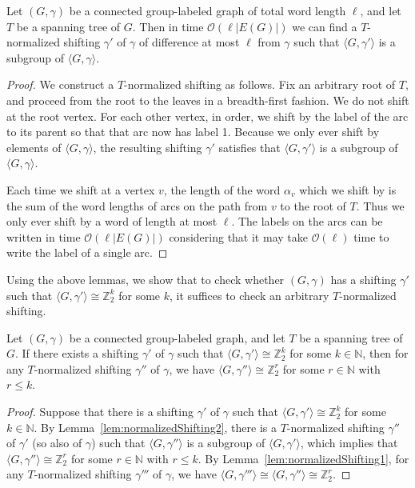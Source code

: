 \documentclass[a4paper, 12pt]{article}
\let\le\leqslant
\let\leq\leqslant
\begin{document}
\begin{lemma}
\label{lem:normalizedShifting2}
    Let $(G,\gamma)$ be a connected group-labeled graph of total word length $\ell$, and let $T$ be a spanning tree of $G$. Then in time $\mathcal{O}(\ell|E(G)|)$ we can find a $T$-normalized shifting $\gamma'$ of $\gamma$ of difference at most $\ell$ from $\gamma$ such that $\langle G, \gamma' \rangle$ is a subgroup of $\langle G, \gamma \rangle$.
\end{lemma}
\begin{proof}
    We construct a $T$-normalized shifting as follows. Fix an arbitrary root of $T$, and proceed from the root to the leaves in a breadth-first fashion. We do not shift at the root vertex. For each other vertex, in order, we shift by the label of the arc to its parent so that that arc now has label 1. Because we only ever shift by elements of $\langle G, \gamma\rangle$, the resulting shifting $\gamma'$ satisfies that $\langle G, \gamma'\rangle$ is a subgroup of $\langle G, \gamma \rangle$.
    
    Each time we shift at a vertex $v$, the length of the word $\alpha_v$ which we shift by is the sum of the word lengths of arcs on the path from $v$ to the root of $T$. Thus we only ever shift by a word of length at most $\ell$. The labels on the arcs can be written in time $\mathcal{O}(\ell|E(G)|)$ considering that it may take $\mathcal{O}(\ell)$ time to write the label of a single arc.
\end{proof}

Using the above lemmas, we show that to check whether $(G,\gamma)$ has a shifting $\gamma'$ such that $\langle G, \gamma'\rangle \cong \mathbb{Z}_2^k$ for some $k$, it suffices to check an arbitrary $T$-normalized shifting.

\begin{lemma}
\label{lem:normalizedShifting3}
    Let $(G, \gamma)$ be a connected group-labeled graph, and let $T$ be a spanning tree of $G$.
    If there exists a shifting $\gamma'$ of $\gamma$ such that $\langle G, \gamma' \rangle \cong \mathbb{Z}_2^k$ for some $k\in \mathbb{N}$, then for any $T$-normalized shifting $\gamma''$ of $\gamma$, we have $\langle G, \gamma'' \rangle \cong \mathbb{Z}_2^{r}$ for some $r \in \mathbb{N}$ with $r \leq k$.
\end{lemma}
\begin{proof}
    Suppose that there is a shifting $\gamma'$ of $\gamma$ such that $\langle G, \gamma' \rangle \cong \mathbb{Z}_2^k$ for some $k\in \mathbb{N}$. By Lemma~\ref{lem:normalizedShifting2}, there is a $T$-normalized shifting $\gamma''$ of $\gamma'$ (so also of $\gamma$) such that $\langle G, \gamma'' \rangle$ is a subgroup of $\langle G, \gamma' \rangle$, which implies that $\langle G, \gamma'' \rangle \cong \mathbb{Z}_2^r$ for some $r \in \mathbb{N}$ with $r \le k$. By Lemma~\ref{lem:normalizedShifting1}, for any $T$-normalized shifting $\gamma'''$ of $\gamma$, we have $\langle G, \gamma''' \rangle \cong \langle G, \gamma'' \rangle \cong \mathbb{Z}_2^r$.
\end{proof}
\end{document}
